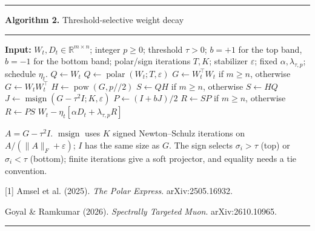 \documentclass[11pt,border=10pt]{standalone}
\begin{document}
\begin{minipage}{6.55in}
\hrule\vspace{5pt}
\textbf{Algorithm 2.} Threshold-selective weight decay
\par\vspace{5pt}\hrule\vspace{8pt}
\begin{algorithmic}[1]
\Statex \textbf{Input:} $W_t,D_t\in\mathbb R^{m\times n}$; integer $p\ge0$; threshold $\tau>0$;
\Statex \hspace{1.1em}$b=+1$ for the top band, $b=-1$ for the bottom band;
\Statex \hspace{1.1em}polar/sign iterations $T,K$; stabilizer $\varepsilon$; fixed $\alpha,\lambda_{\tau,p}$; schedule $\eta_t$.
\Statex
\State $Q\gets W_t$
    \State $Q\gets\operatorname{polar}(W_t;T,\varepsilon)$ 
\EndIf
\State $G\gets W_t^{\top}W_t$ if $m\ge n$, otherwise $G\gets W_tW_t^{\top}$
\State $H\gets\operatorname{pow}(G,p\mathbin{//}2)$
\State $S\gets QH$ if $m\ge n$, otherwise $S\gets HQ$
\State $J\gets\operatorname{msign}(G-\tau^2 I;K,\varepsilon)$ 
\State $P\gets(I+bJ)/2$
\State $R\gets SP$ if $m\ge n$, otherwise $R\gets PS$
\State \Return $W_t-\eta_t[\alpha D_t+\lambda_{\tau,p}R]$
\end{algorithmic}
\vspace{6pt}
\small
$A=G-\tau^2I$. $\operatorname{msign}$ uses $K$ signed Newton--Schulz iterations on
$A/(\lVert A\rVert_F+\varepsilon)$; $I$ has the same size as $G$.
The sign selects $\sigma_i>\tau$ (top) or $\sigma_i<\tau$ (bottom);
finite iterations give a soft projector, and equality needs a tie convention.
\par\vspace{5pt}
[1] Amsel et al. (2025). \textit{The Polar Express}. arXiv:2505.16932.
\par
[2] Goyal \& Ramkumar (2026). \textit{Spectrally Targeted Muon}. arXiv:2610.10965.
\par\vspace{8pt}\hrule
\end{minipage}
\end{document}
